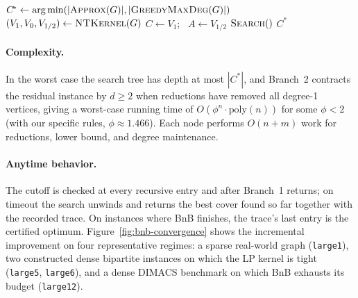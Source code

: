 \documentclass[sigconf]{acmart}
\begin{document}
\begin{algorithm}[t]
  \SetAlgoLined
  \DontPrintSemicolon
  $C^{\!*} \leftarrow \arg\min(|\textsc{Approx}(G)|, |\textsc{GreedyMaxDeg}(G)|)$\;
  $(V_1, V_0, V_{1/2}) \leftarrow \textsc{NTKernel}(G)$
  $C \leftarrow V_1$; \ $A \leftarrow V_{1/2}$\;
  $\textsc{Search}()$\;
  \Return $C^{\!*}$\;
  \BlankLine
  \caption{Branch and Bound for MVC.}
  \label{alg:bnb}
\end{algorithm}

\paragraph{Complexity.} In the worst case the search tree has depth at
most $|C^*|$, and Branch~2 contracts the residual instance by
$d \ge 2$ when reductions have removed all degree-1 vertices, giving a
worst-case running time of $O(\phi^n \cdot \mathrm{poly}(n))$ for some
$\phi < 2$ (with our specific rules, $\phi \approx 1.466$). Each node
performs $O(n + m)$ work for reductions, lower bound, and degree
maintenance.

\paragraph{Anytime behavior.} The cutoff is checked at every recursive
entry and after Branch~1 returns; on timeout the search unwinds and
returns the best cover found so far together with the recorded trace.
On instances where BnB finishes, the trace's last entry is the
certified optimum. Figure~\ref{fig:bnb-convergence} shows the
incremental improvement on four representative regimes: a sparse
real-world graph (\texttt{large1}), two constructed dense bipartite
instances on which the LP kernel is tight (\texttt{large5},
\texttt{large6}), and a dense DIMACS benchmark on which BnB
exhausts its budget (\texttt{large12}).
\end{document}
